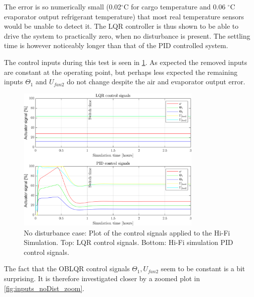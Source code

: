 \noindent The error is so numerically small (0.02$^{\circ}$C for cargo temperature and 0.06 $^{\circ}$C evaporator output refrigerant temperature) that most real temperature sensors would be unable to detect it. The LQR controller is thus shown to be able to drive the system to practically zero, when no disturbance is present. The settling time is however noticeably longer than that of the PID controlled system. 

The control inputs during this test is seen in \cref{fig:inputs_noDist}. As expected the removed inputs are constant at the operating point, but perhaps less expected the remaining inputs $\Theta_1$ and $U_{fan2}$ do not change despite the air and evaporator output error.

\begin{figure}[H]
	\centering
	\includegraphics[width=0.8\textwidth]{Graphics/fig_inputs_noDist.png}
	\caption{No disturbance case: Plot of the control signals applied to the Hi-Fi Simulation. Top: LQR control signals. Bottom: Hi-Fi simulation PID control signals.}
	\label{fig:inputs_noDist}
\end{figure}
The fact that the OBLQR control signals $ \Theta_1, U_{fan2} $ seem to be constant is a bit surprising. It is therefore investigated closer by a zoomed plot in \cref{fig:inputs_noDist_zoom}.

